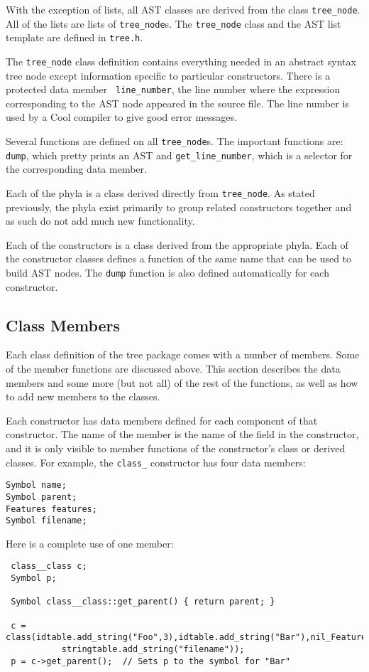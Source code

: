\documentclass[11pt]{article}
\begin{document}
With the exception of lists, all AST classes are derived from the
class {\tt tree\_node}.  All of the lists are lists of {\tt tree\_node}s.
The {\tt tree\_node} class and the AST list template are defined in 
{\tt tree.h}.

The {\tt tree\_node} class definition contains everything needed in an
abstract syntax tree node except information specific to particular
constructors.  There is a protected data member {\tt
line\_number}, the line number where the expression corresponding to
the AST node appeared in the source file.
 The line number is used by a Cool compiler to give good
error messages.  

Several functions are defined on all {\tt tree\_node}s.  The important functions
are: {\tt dump}, which pretty prints an AST and {\tt get\_line\_number},
which is a selector for the corresponding data member.

Each of the phyla is a class derived directly from {\tt tree\_node}.  As stated
previously, the phyla exist primarily to group related constructors together
and as such do not add much new functionality.

Each of the constructors is a class derived from the appropriate
phyla.  Each of the constructor classes defines a function of the same
name that can be used to build AST nodes.  The {\tt dump} function is
also defined automatically for each constructor.

\subsection{Class Members}
\label{sec-sel}

Each class definition of the tree package comes with a number of
members.  Some of the member functions are discussed above.
This section describes the data members and some more (but not all) of
the rest of the functions, as well as how to add new members
to the classes.  

Each constructor has data members defined for
each component of that constructor. The name of the member is the name of
the field in the constructor, and it is only visible to member functions
of the constructor's class or derived classes.
 For example, the {\tt class\_} constructor
has four data members:
\begin{verbatim}
Symbol name;
Symbol parent;
Features features;
Symbol filename;
\end{verbatim}
Here is a complete use of one member:
\begin{verbatim}
 class__class c;
 Symbol p;

 Symbol class__class::get_parent() { return parent; }

 c = class(idtable.add_string("Foo",3),idtable.add_string("Bar"),nil_Features(),
           stringtable.add_string("filename"));
 p = c->get_parent();  // Sets p to the symbol for "Bar"
\end{verbatim}
\end{document}
